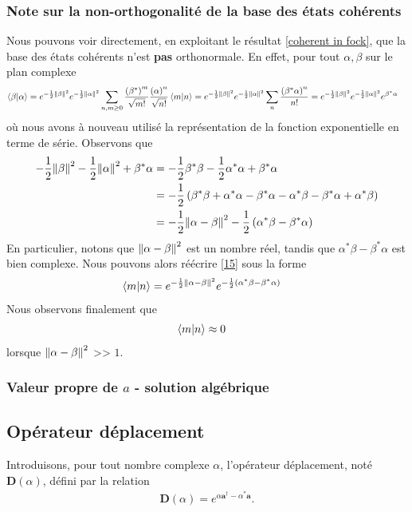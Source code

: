 \documentclass[11pt,oneside,a4paper]{article}
\begin{document}
\subsubsection{Note sur la non-orthogonalité de la base des états cohérents}
Nous pouvons voir directement, en exploitant le résultat \ref{coherent in fock}, que la base des états cohérents n'est \textbf{pas} orthonormale. En effet, pour tout $\alpha,\beta$ sur le plan complexe
\begin{align}
  \braket{\beta}{\alpha} &= e^{-\frac{1}{2}\norm{\beta}^2}e^{-\frac{1}{2}\norm{\alpha}^2}\sum_{n,m\geq 0}\frac{\left(\beta^*\right)^m}{\sqrt{m!}}\frac{\left(\alpha\right)^n}{\sqrt{n!}}\braket{m}{n}
  = e^{-\frac{1}{2}\norm{\beta}^2}e^{-\frac{1}{2}\norm{\alpha}^2} \sum_n \frac{\left(\beta^*\alpha\right)^n}{n!} = e^{-\frac{1}{2}\norm{\beta}^2}e^{-\frac{1}{2}\norm{\alpha}^2}e^{\beta^*\alpha}\label{15}
\end{align}
où nous avons à nouveau utilisé la représentation de la fonction exponentielle en terme de série. Observons que 
\begin{align}
  -\frac{1}{2}\norm{\beta}^2-\frac{1}{2}\norm{\alpha}^2+\beta^*\alpha &= -\frac{1}{2}\beta^*\beta - \frac{1}{2}\alpha^*\alpha+\beta^*\alpha\\
  &= -\frac{1}{2}\left(\beta^*\beta+\alpha^*\alpha-\beta^*\alpha-\alpha^*\beta-\beta^*\alpha+\alpha^*\beta\right)\\
  &= -\frac{1}{2}\norm{\alpha-\beta}^2-\frac{1}{2}\left(\alpha^*\beta-\beta^*\alpha\right)
\end{align}
En particulier, notons que $\norm{\alpha-\beta}^2$ est un nombre réel, tandis que $\alpha^*\beta-\beta^*\alpha$ est bien complexe. Nous pouvons alors réécrire \eqref{15} sous la forme
\begin{align}
  \braket{m}{n} &= e^{-\frac{1}{2}\norm{\alpha-\beta}^2}e^{-\frac{1}{2}\left(\alpha^*\beta-\beta^*\alpha\right)}
\end{align}
Nous observons finalement que
\begin{align}
  \braket{m}{n} &\approx 0
\end{align}
lorsque $\norm{\alpha-\beta}^2$ >> $1$.

\subsubsection{Valeur propre de $a$ - solution algébrique}

\subsection{Opérateur déplacement}
Introduisons, pour tout nombre complexe $\alpha$, l'opérateur déplacement, noté $\bm{D}(\alpha)$, défini par la relation
\begin{align}
  \bm{D}(\alpha) = e^{\alpha \bm{a}^\dagger-\alpha^*\bm{a}}.
\end{align}
\end{document}
